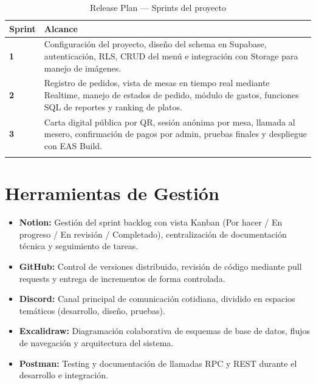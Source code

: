\begin{longtable}{>{\bfseries}p{1.5cm} p{11.5cm}}
  \toprule
  \textbf{Sprint} & \textbf{Alcance} \\
  \midrule
  \endhead

  1 & Configuración del proyecto, diseño del schema en Supabase,
      autenticación, RLS, CRUD del menú e integración con Storage
      para manejo de imágenes. \\[4pt]

  2 & Registro de pedidos, vista de mesas en tiempo real mediante
      Realtime, manejo de estados de pedido, módulo de gastos,
      funciones SQL de reportes y ranking de platos. \\[4pt]

  3 & Carta digital pública por QR, sesión anónima por mesa,
      llamada al mesero, confirmación de pagos por admin,
      pruebas finales y despliegue con EAS Build. \\

  \bottomrule
  \caption{Release Plan — Sprints del proyecto}
\end{longtable}

\section{Herramientas de Gestión}

\begin{itemize}[leftmargin=1.5em]
  \item \textbf{Notion:} Gestión del sprint backlog con vista Kanban
        (Por hacer / En progreso / En revisión / Completado),
        centralización de documentación técnica y seguimiento de tareas.
  \item \textbf{GitHub:} Control de versiones distribuido, revisión de código
        mediante pull requests y entrega de incrementos de forma controlada.
  \item \textbf{Discord:} Canal principal de comunicación cotidiana,
        dividido en espacios temáticos (desarrollo, diseño, pruebas).
  \item \textbf{Excalidraw:} Diagramación colaborativa de esquemas de base de
        datos, flujos de navegación y arquitectura del sistema.
  \item \textbf{Postman:} Testing y documentación de llamadas RPC y REST
        durante el desarrollo e integración.
\end{itemize}